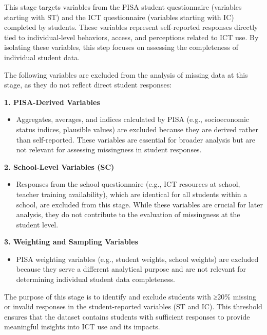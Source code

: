 \documentclass[
]{article}
\providecommand{\tightlist}{%
  \setlength{\itemsep}{0pt}\setlength{\parskip}{0pt}}
\begin{document}
This stage targets variables from the PISA student questionnaire
(variables starting with ST) and the ICT questionnaire (variables
starting with IC) completed by students. These variables represent
self-reported responses directly tied to individual-level behaviors,
access, and perceptions related to ICT use. By isolating these
variables, this step focuses on assessing the completeness of individual
student data.

The following variables are excluded from the analysis of missing data
at this stage, as they do not reflect direct student responses:

\textbf{1. PISA-Derived Variables}

\begin{itemize}
\tightlist
\item
  Aggregates, averages, and indices calculated by PISA (e.g.,
  socioeconomic status indices, plausible values) are excluded because
  they are derived rather than self-reported. These variables are
  essential for broader analysis but are not relevant for assessing
  missingness in student responses.
\end{itemize}

\textbf{2. School-Level Variables (SC)}

\begin{itemize}
\tightlist
\item
  Responses from the school questionnaire (e.g., ICT resources at
  school, teacher training availability), which are identical for all
  students within a school, are excluded from this stage. While these
  variables are crucial for later analysis, they do not contribute to
  the evaluation of missingness at the student level.
\end{itemize}

\textbf{3. Weighting and Sampling Variables}

\begin{itemize}
\tightlist
\item
  PISA weighting variables (e.g., student weights, school weights) are
  excluded because they serve a different analytical purpose and are not
  relevant for determining individual student data completeness.
\end{itemize}

The purpose of this stage is to identify and exclude students with ≥20\%
missing or invalid responses in the student-reported variables (ST and
IC). This threshold ensures that the dataset contains students with
sufficient responses to provide meaningful insights into ICT use and its
impacts.
\end{document}
